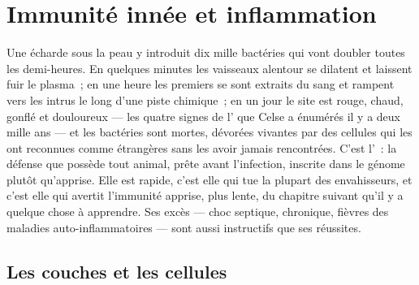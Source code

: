 \chapter{Immunité innée et inflammation}\label{ch:b3:innate-immunity}

Une écharde sous la peau y introduit dix mille bactéries qui vont
doubler toutes les demi-heures. En quelques minutes les vaisseaux
alentour se dilatent et laissent fuir le plasma~; en une heure les
premiers  se sont extraits du sang et rampent vers les
intrus le long d'une piste chimique~; en un jour le site est rouge,
chaud, gonflé et douloureux --- les quatre signes de l' que
Celse a énumérés il y a deux mille ans --- et les bactéries sont mortes,
dévorées vivantes par des cellules qui les ont reconnues comme
étrangères sans les avoir jamais rencontrées. C'est l'~:
la défense que possède tout animal, prête avant l'infection, inscrite
dans le génome plutôt qu'apprise. Elle est rapide, c'est elle qui tue la
plupart des envahisseurs, et c'est elle qui avertit l'immunité apprise,
plus lente, du chapitre suivant qu'il y a quelque chose à apprendre. Ses
excès --- choc septique,  chronique, fièvres des maladies
auto-inflammatoires --- sont aussi instructifs que ses réussites.

\section{Les couches et les cellules}

